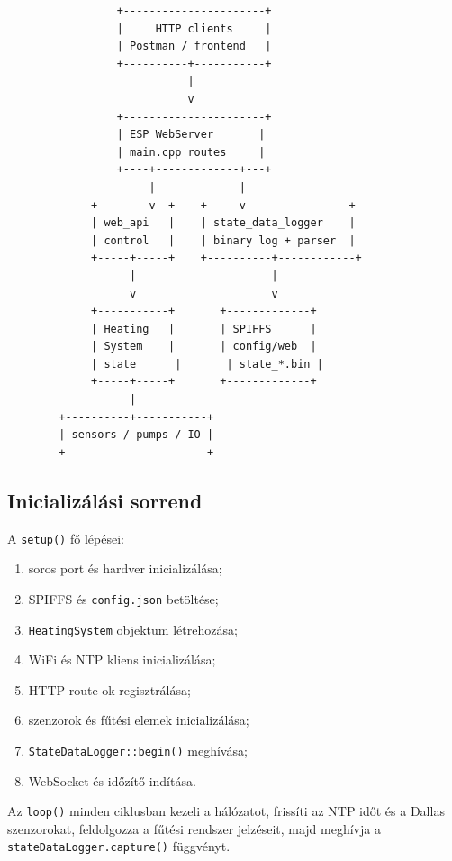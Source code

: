 \documentclass[11pt,a4paper]{article}
\begin{document}
\begin{lstlisting}
                 +----------------------+
                 |     HTTP clients     |
                 | Postman / frontend   |
                 +----------+-----------+
                            |
                            v
                 +----------------------+
                 | ESP WebServer       |
                 | main.cpp routes     |
                 +----+-------------+---+
                      |             |
             +--------v--+    +-----v----------------+
             | web_api   |    | state_data_logger    |
             | control   |    | binary log + parser  |
             +-----+-----+    +----------+------------+
                   |                     |
                   v                     v
             +-----------+       +-------------+
             | Heating   |       | SPIFFS      |
             | System    |       | config/web  |
             | state      |       | state_*.bin |
             +-----+-----+       +-------------+
                   |
        +----------+-----------+
        | sensors / pumps / IO |
        +----------------------+
\end{lstlisting}

\subsection{Inicializálási sorrend}

A \texttt{setup()} fő lépései:

\begin{enumerate}
  \item soros port és hardver inicializálása;
  \item SPIFFS és \texttt{config.json} betöltése;
  \item \texttt{HeatingSystem} objektum létrehozása;
  \item WiFi és NTP kliens inicializálása;
  \item HTTP route-ok regisztrálása;
  \item szenzorok és fűtési elemek inicializálása;
  \item \texttt{StateDataLogger::begin()} meghívása;
  \item WebSocket és időzítő indítása.
\end{enumerate}

Az \texttt{loop()} minden ciklusban kezeli a hálózatot, frissíti az NTP időt és a Dallas szenzorokat, feldolgozza a fűtési rendszer jelzéseit, majd meghívja a \texttt{stateDataLogger.capture()} függvényt.
\end{document}
